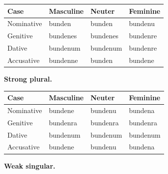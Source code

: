 \par\begingroup
\fontsize{10.5}{13.2}\selectfont
\setlength{\LTleft}{0pt}\setlength{\LTright}{\fill}
\noindent
\begin{tabular}{@{}>{\raggedright\arraybackslash}p{22.0mm}>{\raggedright\arraybackslash}p{31.188mm}>{\raggedright\arraybackslash}p{31.188mm}>{\raggedright\arraybackslash}p{31.188mm}@{}}
\toprule
\textbf{Case} & \textbf{Masculine} & \textbf{Neuter} & \textbf{Feminine} \\
\midrule
Nominative & bunden & bunden & bundenu \\
Genitive & bundenes & bundenes & bundenre \\
Dative & bundenum & bundenum & bundenre \\
Accusative & bundenne & bunden & bundene \\
\bottomrule
\end{tabular}
\par\endgroup
\textbf{Strong plural.}

\par\begingroup
\fontsize{10.5}{13.2}\selectfont
\setlength{\LTleft}{0pt}\setlength{\LTright}{\fill}
\noindent
\begin{tabular}{@{}>{\raggedright\arraybackslash}p{22.0mm}>{\raggedright\arraybackslash}p{31.188mm}>{\raggedright\arraybackslash}p{31.188mm}>{\raggedright\arraybackslash}p{31.188mm}@{}}
\toprule
\textbf{Case} & \textbf{Masculine} & \textbf{Neuter} & \textbf{Feminine} \\
\midrule
Nominative & bundene & bundenu & bundena \\
Genitive & bundenra & bundenra & bundenra \\
Dative & bundenum & bundenum & bundenum \\
Accusative & bundene & bundenu & bundena \\
\bottomrule
\end{tabular}
\par\endgroup
\textbf{Weak singular.}

